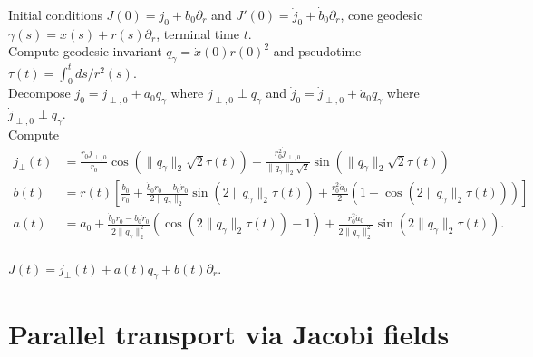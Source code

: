 \documentclass{article}
\begin{document}
\begin{algorithm}[H]
    \begin{algorithmic}[1]
        \caption{Jacobi field on $\mathfrak{C}(\mathbb{R}^d)$}
        \label{alg: jacobi field}
        \Require Initial conditions $J(0) = j_0 + b_0\partial_r$ and $J'(0) = \dot j_0 + \dot b_0 \partial_r$, cone geodesic $\gamma(s) = x(s) + r(s)\partial_r$, terminal time $t$.\\
        Compute geodesic invariant $q_\gamma = \dot x(0)r(0)^2$ and pseudotime $\tau(t) = \int_0^tds/r^2(s)$. \\
        Decompose $j_0 = j_{\perp, 0} + a_0q_{\gamma}$ where $j_{\perp, 0} \perp q_{\gamma}$ and $\dot j_0 = \dot j_{\perp, 0} + \dot a_0q_{\gamma}$ where $\dot j_{\perp, 0} \perp q_{\gamma}$.\\
        Compute 
        \begin{align*}
        j_{\perp}(t) &= \frac{r_0j_{\perp,0}}{r_0}\cos(\|q_{\gamma}\|_2\sqrt{2}\tau(t)) + \frac{r_0^2\dot j_{\perp, 0}}{\|q_{\gamma}\|_2\sqrt{2}}\sin(\|q_{\gamma}\|_2\sqrt{2}\tau(t)) \\
        b(t) &= r(t)\left[\frac{b_0}{r_0} + \frac{\dot b_0r_0 - b_0\dot r_0}{2\|q_{\gamma}\|_2}\sin(2\|q_{\gamma}\|_2\tau(t)) + \frac{r_0^2\dot a_0}{2} (1- \cos(2\|q_{\gamma}\|_2\tau(t)))\right] \\
        a(t) &= a_0 + \frac{\dot b_0r_0 - b_0\dot r_0}{2\|q_{\gamma}\|_2^2}(\cos(2\|q_{\gamma}\|_2\tau(t))-1) + \frac{r_0^2\dot a_0}{2\|q_{\gamma}\|_2^2}\sin(2\|q_{\gamma}\|_2\tau(t)).
        \end{align*}
        \\ \Return $J(t) = j_{\perp}(t) + a(t)q_{\gamma} + b(t)\partial_r$.
    \end{algorithmic}
\end{algorithm}

\section{Parallel transport via Jacobi fields}
\end{document}
